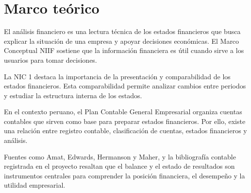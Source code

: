 \section{Marco teórico}

El análisis financiero es una lectura técnica de los estados financieros que busca explicar la situación de una empresa y apoyar decisiones económicas. El Marco Conceptual NIIF sostiene que la información financiera es útil cuando sirve a los usuarios para tomar decisiones.

La NIC 1 destaca la importancia de la presentación y comparabilidad de los estados financieros. Esta comparabilidad permite analizar cambios entre periodos y estudiar la estructura interna de los estados.

En el contexto peruano, el Plan Contable General Empresarial organiza cuentas contables que sirven como base para preparar estados financieros. Por ello, existe una relación entre registro contable, clasificación de cuentas, estados financieros y análisis.

Fuentes como Amat, Edwards, Hermanson y Maher, y la bibliografía contable registrada en el proyecto resaltan que el balance y el estado de resultados son instrumentos centrales para comprender la posición financiera, el desempeño y la utilidad empresarial.
